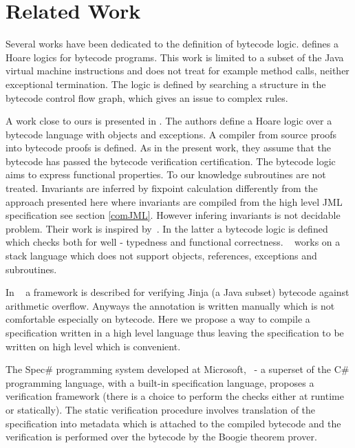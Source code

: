 \section{Related Work} \label{relWork}
    

Several works have been dedicated to the definition of bytecode logic.
 \cite{Quigley} defines a Hoare logics for bytecode programs. This work is limited to a subset of the Java virtual machine instructions and does not treat for example method calls, neither exceptional termination. The logic is defined by searching a structure in the bytecode control flow graph, which gives an issue to complex rules.

A work close to ours is presented in \cite{BM05plb}. The authors define a Hoare logic over a bytecode language with objects and  exceptions. A compiler from source proofs into bytecode proofs is defined. As in the present work, they assume that the bytecode has passed the bytecode verification certification. The bytecode logic aims to express functional properties. To our knowledge subroutines are not treated. Invariants are inferred by fixpoint calculation differently from the approach presented here where invariants are compiled from the high level JML specification see section \ref{comJML}. However infering invariants is not decidable problem. Their work is inspired by~\cite{B04tlsj}. In the latter a bytecode logic is defined which checks both for well - typedness and functional correctness. ~\cite{B04tlsj} works on a stack language which does not support objects, references, exceptions and subroutines. 

In ~\cite{WildmoserN-ESOP05} a  framework is described for verifying Jinja (a Java subset) bytecode against arithmetic overflow. Anyways the annotation is written manually which is not comfortable especially on bytecode. Here we propose a way to compile a specification written in a high level language thus leaving the specification to be written on high level which is convenient.

The Spec\# programming system developed at Microsoft,~\cite{BLS04sp} - a superset of the C\# programming language, with a built-in  specification language,
 proposes a verification framework (there is a choice to perform the checks either at runtime or statically). The static verification procedure  involves translation of the specification into metadata which is attached to the compiled bytecode and the verification is performed over the bytecode by the Boogie theorem prover. 
 
